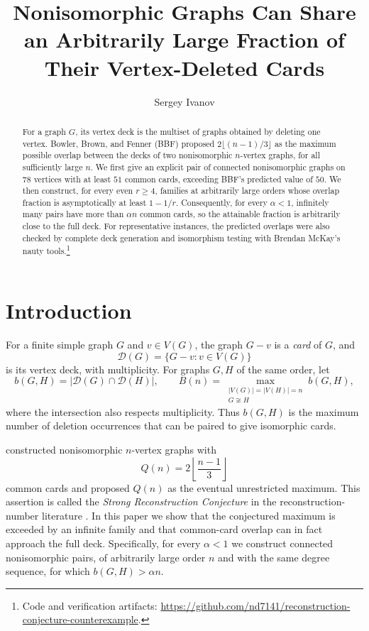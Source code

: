 \documentclass[11pt]{article}
\title{Nonisomorphic Graphs Can Share an Arbitrarily Large Fraction of Their Vertex-Deleted Cards}
\author{Sergey Ivanov}
\date{}
\newcommand{\Deck}{\mathcal D}
\begin{document}
\maketitle

\begin{abstract}
For a graph $G$, its vertex deck is the multiset of graphs obtained by deleting one vertex.
Bowler, Brown, and Fenner (BBF) proposed $2\lfloor(n-1)/3\rfloor$ as the maximum possible overlap
between the decks of two nonisomorphic $n$-vertex graphs, for all sufficiently large $n$.
We first give an explicit pair of connected nonisomorphic graphs on $78$ vertices with at least
$51$ common cards, exceeding BBF's predicted value of $50$. We then construct, for every even
$r\ge4$, families at arbitrarily large orders whose overlap fraction is asymptotically at least
$1-1/r$. Consequently, for every $\alpha<1$, infinitely many pairs have more than $\alpha n$ common
cards, so the attainable fraction is arbitrarily close to the full deck. For representative instances,
the predicted overlaps were also checked by complete deck generation and isomorphism testing with
Brendan McKay's nauty tools.\footnote{Code and verification artifacts:
\url{https://github.com/nd7141/reconstruction-conjecture-counterexample}.}
\end{abstract}

\section{Introduction}\label{sec:intro}
For a finite simple graph $G$ and $v\in V(G)$, the graph $G-v$ is a \emph{card} of $G$, and
\[
  \Deck(G)=\{G-v:v\in V(G)\}
\]
is its vertex deck, with multiplicity. For graphs $G,H$ of the same order, let
\[
 b(G,H)=|\Deck(G)\cap\Deck(H)|,
 \qquad
 B(n)=\max_{\substack{|V(G)|=|V(H)|=n\\G\not\cong H}} b(G,H),
\]
where the intersection also respects multiplicity. Thus $b(G,H)$ is the maximum number of deletion
occurrences that can be paired to give isomorphic cards.

\citet{BBF10} constructed nonisomorphic $n$-vertex graphs with
\[
 Q(n)=2\left\lfloor\frac{n-1}{3}\right\rfloor
\]
common cards and proposed $Q(n)$ as the eventual unrestricted maximum. This assertion is called the
\emph{Strong Reconstruction Conjecture} in the reconstruction-number literature
\citep{AFLM10,BF20slides}. In this paper we show that the conjectured maximum is exceeded by an infinite
family and that common-card overlap can in fact approach the full deck. Specifically, for every
$\alpha<1$ we construct connected nonisomorphic pairs, of arbitrarily large order $n$ and with the same
degree sequence, for which $b(G,H)>\alpha n$.
\end{document}
